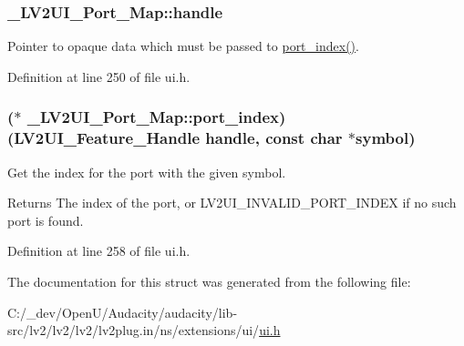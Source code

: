 \subsubsection[{\texorpdfstring{handle}{handle}}]{ \+\_\+\+L\+V2\+U\+I\+\_\+\+Port\+\_\+\+Map\+::handle}\hypertarget{struct___l_v2_u_i___port___map_a3cd2d716f3f3d42bda10a4520108ea2e}{}\label{struct___l_v2_u_i___port___map_a3cd2d716f3f3d42bda10a4520108ea2e}
Pointer to opaque data which must be passed to \hyperlink{struct___l_v2_u_i___port___map_a5a011cf306c6f69084beb121d296e885}{port\+\_\+index()}. 

Definition at line 250 of file ui.\+h.

\subsubsection[{\texorpdfstring{port\+\_\+index}{port_index}}]{($\ast$ \+\_\+\+L\+V2\+U\+I\+\_\+\+Port\+\_\+\+Map\+::port\+\_\+index) ({\bf L\+V2\+U\+I\+\_\+\+Feature\+\_\+\+Handle} {\bf handle}, {\bf const} char $\ast$symbol)}\hypertarget{struct___l_v2_u_i___port___map_a5a011cf306c6f69084beb121d296e885}{}\label{struct___l_v2_u_i___port___map_a5a011cf306c6f69084beb121d296e885}
Get the index for the port with the given {\ttfamily symbol}.

\begin{DoxyReturn}{Returns}
The index of the port, or L\+V2\+U\+I\+\_\+\+I\+N\+V\+A\+L\+I\+D\+\_\+\+P\+O\+R\+T\+\_\+\+I\+N\+D\+EX if no such port is found. 
\end{DoxyReturn}


Definition at line 258 of file ui.\+h.



The documentation for this struct was generated from the following file\+:\begin{DoxyCompactItemize}
\item 
C\+:/\+\_\+dev/\+Open\+U/\+Audacity/audacity/lib-\/src/lv2/lv2/lv2/lv2plug.\+in/ns/extensions/ui/\hyperlink{ui_8h}{ui.\+h}\end{DoxyCompactItemize}
